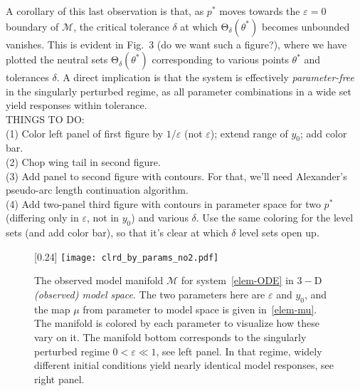 \documentclass{article}
\newcommand{\eps}{\varepsilon}
\newcommand{\p}{\theta}
\newcommand{\omr}{\mu}
\newcommand{\omm}{\mathcal{M}}
\newcommand{\ps}{\mathrm{\Theta}}
\begin{document}
A corollary of this last observation is that, as $p^*$ moves towards the $\eps = 0$ boundary of $\omm$, the critical tolerance $\delta$ at which $\ps_\delta(\p^*)$ becomes unbounded vanishes.
This is evident in Fig.~3 (do we want such a figure?), where we have plotted the neutral sets $\ps_\delta(\p^*)$ corresponding to various points $\p^*$ and tolerances $\delta$.
A direct implication is that the system is effectively \emph{parameter-free} in the singularly perturbed regime, as all parameter combinations in a wide set yield responses within tolerance.\\

THINGS TO DO:\\
(1) Color left panel of first figure by $1/\eps$ (not $\eps$); extend range of $y_0$; add color bar.\\
(2) Chop wing tail in second figure.\\
(3) Add panel to second figure with contours. For that, we'll need Alexander's pseudo-arc length continuation algorithm.\\
(4) Add two-panel third figure with contours in parameter space for two $p^*$ (differing only in $\eps$, not in $y_0$) and various $\delta$. Use the same coloring for the level sets (and add color bar), so that it's clear at which $\delta$ level sets open up.


%
\begin{figure}[t]
\scalebox{0.24}[0.24]{
\texttt{[image: clrd\_by\_params\_no2.pdf]}
}
\caption{\label{f.elem.ex.1}
The observed model manifold $\omm$ for system~\eqref{elem-ODE} in $3-$D \emph{(observed) model space}.
The two parameters here are $\eps$ and $y_0$, and the map $\omr$ from  parameter to model space is given in~\eqref{elem-mu}.
The manifold is colored by each parameter to visualize how these vary on it.
The manifold bottom corresponds to the singularly perturbed regime $0 < \eps \ll 1$, see left panel.
In that regime, widely different initial conditions yield nearly identical model responses, see right panel.}
\end{figure}
%
\end{document}
